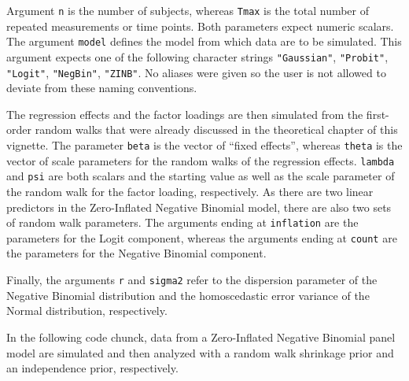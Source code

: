 \documentclass[a4paper, preprint, 3p,
authoryear]{elsarticle} %
\begin{document}
Argument \texttt{n} is the number of subjects, whereas \texttt{Tmax} is
the total number of repeated measurements or time points. Both
parameters expect numeric scalars. The argument \texttt{model} defines
the model from which data are to be simulated. This argument expects one
of the following character strings \texttt{"Gaussian"},
\texttt{"Probit"}, \texttt{"Logit"}, \texttt{"NegBin"}, \texttt{"ZINB"}.
No aliases were given so the user is not allowed to deviate from these
naming conventions.

The regression effects and the factor loadings are then simulated from
the first-order random walks that were already discussed in the
theoretical chapter of this vignette. The parameter \texttt{beta} is the
vector of ``fixed effects'', whereas \texttt{theta} is the vector of
scale parameters for the random walks of the regression effects.
\texttt{lambda} and \texttt{psi} are both scalars and the starting value
as well as the scale parameter of the random walk for the factor
loading, respectively. As there are two linear predictors in the
Zero-Inflated Negative Binomial model, there are also two sets of random
walk parameters. The arguments ending at \texttt{inflation} are the
parameters for the Logit component, whereas the arguments ending at
\texttt{count} are the parameters for the Negative Binomial component.

Finally, the arguments \texttt{r} and \texttt{sigma2} refer to the
dispersion parameter of the Negative Binomial distribution and the
homoscedastic error variance of the Normal distribution, respectively.

In the following code chunck, data from a Zero-Inflated Negative
Binomial panel model are simulated and then analyzed with a random walk
shrinkage prior and an independence prior, respectively.


\end{document}
